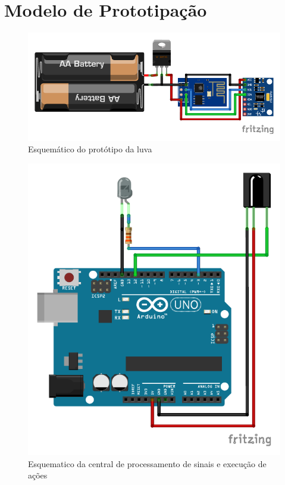 \section{Modelo de Prototipação}

\begin{figure}
    \centering
    \includegraphics{resources/esquematico_tcc_bb.pdf}
    \caption{Esquemático do protótipo da luva}
    \label{fig:my_label}
\end{figure}

\begin{figure}
    \centering
    \includegraphics{resources/esquematico_central_bb.pdf}
    \caption{Esquematico da central de processamento de sinais e execução de ações}
    \label{fig:esq_central}
\end{figure}

